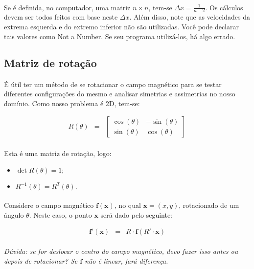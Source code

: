 \documentclass[introducao.tex]{subfiles}
\begin{document}
\paragraph{} Se é definida, no computador, uma matriz $n\times n$, tem-se $\Delta x = \frac{1}{n-2}$. Os cálculos devem ser todos feitos com base neste $\Delta x$. Além disso, note que as velocidades da extrema esquerda e do extremo inferior não são utilizadas. Você pode declarar tais valores como Not a Number. Se seu programa utilizá-los, há algo errado.

\domainOne

\subsection{Matriz de rotação}
\paragraph{} É útil ter um método de se rotacionar o campo magnético para se testar diferentes configurações do mesmo e analisar simetrias e assimetrias no nosso domínio. Como nosso problema é 2D, tem-se:

\begin{eqnarray}
R(\theta) & =& \left[\begin{array}{cc}
\cos(\theta) & -\sin(\theta)\\
\sin(\theta)  & \cos(\theta)
\end{array}\right]
\end{eqnarray}
\paragraph{} Esta é uma matriz de rotação, logo:
\begin{itemize}
	\item $\det R(\theta) = 1$;
	\item $R^{-1}(\theta) = R^T(\theta)$.
\end{itemize}

\paragraph{} Considere o campo magnético $\mathbf{f}(\mathbf{x})$, no qual $\mathbf{x} = (x,y)$, rotacionado de um ângulo $\theta$. Neste caso, o ponto $\mathbf{x}$ será dado pelo seguinte:

\begin{eqnarray}
\mathbf{f}'(\mathbf{x}) & = & R\cdot \mathbf{f}(R'\cdot \mathbf{x})
\end{eqnarray}

\paragraph{} \textit{Dúvida: se for deslocar o centro do campo magnético, devo fazer isso antes ou depois de rotacionar? Se $\mathbf{f}$ não é linear, fará diferença.}
\end{document}
